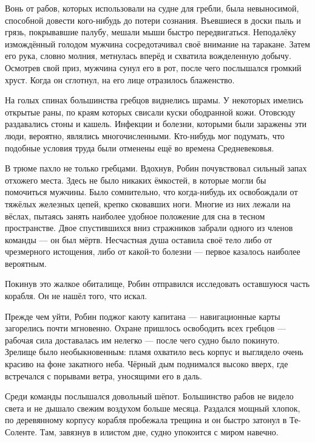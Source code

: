 \documentclass[a4paper,12pt]{book}
\begin{document}
\par
Вонь от рабов, которых использовали на судне для гребли, была невыносимой, способной довести кого-нибудь до потери сознания. Въевшиеся в доски пыль и грязь, покрывавшие палубу, мешали мыши быстро передвигаться. Неподалёку измождённый голодом мужчина сосредотачивал своё внимание на таракане. Затем его рука, словно молния, метнулась вперёд и схватила вожделенную добычу. Осмотрев свой приз, мужчина сунул его в рот, после чего послышался громкий хруст. Когда он сглотнул, на его лице отразилось блаженство.
\par
На голых спинах большинства гребцов виднелись шрамы. У некоторых имелись открытые раны, по краям которых свисали куски ободранной кожи. Отовсюду раздавались стоны и кашель. Инфекции и болезни, которыми были заражены эти люди, вероятно, являлись многочисленными. Кто-нибудь мог подумать, что подобные условия труда были отменены ещё во времена Средневековья.
\par
В трюме пахло не только гребцами. Вдохнув, Робин почувствовал сильный запах отхожего места. Здесь не было никаких ёмкостей, в которые могли бы помочиться мужчины. Было сомнительно, что когда-нибудь их освобождали от тяжёлых железных цепей, крепко сковавших ноги. Многие из них лежали на вёслах, пытаясь занять наиболее удобное положение для сна в тесном пространстве. Двое спустившихся вниз стражников забрали одного из членов команды — он был мёртв. Несчастная душа оставила своё тело либо от чрезмерного истощения, либо от какой-то болезни — первое казалось наиболее вероятным.\\
\par
Покинув это жалкое обиталище, Робин отправился исследовать оставшуюся часть корабля. Он не нашёл того, что искал.
\par
Прежде чем уйти, Робин поджог каюту капитана — навигационные карты загорелись почти мгновенно. Охране пришлось освободить всех гребцов — рабочая сила доставалась им нелегко — после чего судно было покинуто. Зрелище было необыкновенным: пламя охватило весь корпус и выглядело очень красиво на фоне закатного неба. Чёрный дым поднимался высоко вверх, где встречался с порывами ветра, уносящими его в даль.
\par
Среди команды послышался довольный шёпот. Большинство рабов не видело света и не дышало свежим воздухом больше месяца. Раздался мощный хлопок, по деревянному корпусу корабля пробежала трещина и он быстро затонул в Те-Соленте. Там, завязнув в илистом дне, судно упокоится с миром навечно.
\par
\end{document}

